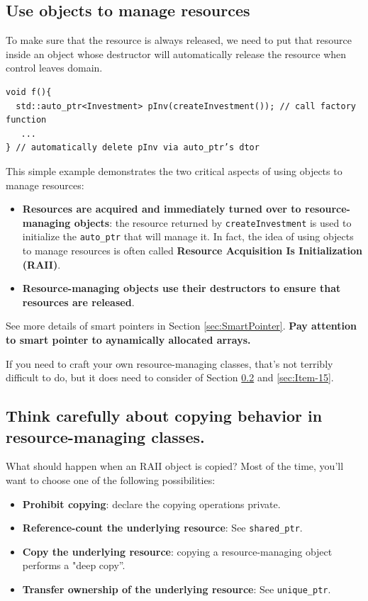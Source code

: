 \subsection{Use objects to manage resources}
\label{sec:Item-13}

To make sure that the resource  is always released, we need to put
that resource inside an object whose destructor will automatically
release the resource when control leaves domain.
\begin{verbatim}
void f(){
  std::auto_ptr<Investment> pInv(createInvestment()); // call factory function
   ... 
} // automatically delete pInv via auto_ptr’s dtor
\end{verbatim}

This simple example demonstrates the two critical aspects of using
objects to manage resources:
\begin{itemize}
\item \textbf{Resources are acquired and immediately turned over to
  resource-managing objects}: the resource returned by
  \texttt{createInvestment} 
  is used to initialize the \texttt{auto\_ptr} that will manage it. In 
fact, the idea of using objects to manage resources is often called
\textbf{Resource Acquisition Is Initialization (RAII)}.
\item \textbf{Resource-managing objects use their destructors to ensure
that resources are released}.
\end{itemize}

See more details of smart pointers in Section \ref{sec:SmartPointer}.
\textbf{Pay attention to smart pointer to aynamically allocated arrays.}

If you need to craft your own resource-managing
classes, that's not terribly difficult to do, but it does need to
consider of Section \ref{sec:Item-14} and \ref{sec:Item-15}.

\subsection{Think carefully about copying behavior in
  resource-managing classes.}
\label{sec:Item-14}

What should happen when an RAII object is copied? Most of the time,
you'll want to choose one of the following possibilities:

\begin{itemize}
\item \textbf{Prohibit copying}: declare the copying operations
  private.
\item \textbf{Reference-count the underlying resource}: See
  \texttt{shared\_ptr}.
\item \textbf{Copy the underlying resource}: copying a
  resource-managing object performs a "deep copy''.
\item \textbf{Transfer ownership of the underlying resource}: See \texttt{unique\_ptr}.
\end{itemize}

